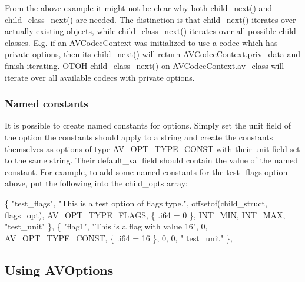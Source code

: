 From the above example it might not be clear why both child\+\_\+next() and child\+\_\+class\+\_\+next() are needed. The distinction is that child\+\_\+next() iterates over actually existing objects, while child\+\_\+class\+\_\+next() iterates over all possible child classes. E.\+g. if an \hyperlink{struct_a_v_codec_context}{A\+V\+Codec\+Context} was initialized to use a codec which has private options, then its child\+\_\+next() will return \hyperlink{struct_a_v_codec_context_af3379123060ad8cc9c321c29af4f8360}{A\+V\+Codec\+Context.\+priv\+\_\+data} and finish iterating. O\+T\+OH child\+\_\+class\+\_\+next() on \hyperlink{struct_a_v_codec_context_a90622d3af2a9abba986a1c9f7ca21b16}{A\+V\+Codec\+Context.\+av\+\_\+class} will iterate over all available codecs with private options.\hypertarget{group__avoptions_avoptions_implement_named_constants}{}\subsubsection{Named constants}\label{group__avoptions_avoptions_implement_named_constants}
It is possible to create named constants for options. Simply set the unit field of the option the constants should apply to a string and create the constants themselves as options of type A\+V\+\_\+\+O\+P\+T\+\_\+\+T\+Y\+P\+E\+\_\+\+C\+O\+N\+ST with their unit field set to the same string. Their default\+\_\+val field should contain the value of the named constant. For example, to add some named constants for the test\+\_\+flags option above, put the following into the child\+\_\+opts array\+: 
\begin{DoxyCode}
\{ \textcolor{stringliteral}{"test\_flags"}, \textcolor{stringliteral}{"This is a test option of flags type."},
  offsetof(child\_struct, flags\_opt), \hyperlink{group__avoptions_ggabd75aa30eb8ad6387672df9a1fa79444a7aaeee142b88a3078ddc57c644b49a7e}{AV\_OPT\_TYPE\_FLAGS}, \{ .i64 = 0 \}, 
      \hyperlink{macint_8h_a21658776274b3d146c674318b635a334}{INT\_MIN}, \hyperlink{macint_8h_a9ec306f36d50c7375e74f0d1c55a3a67}{INT\_MAX}, \textcolor{stringliteral}{"test\_unit"} \},
\{ \textcolor{stringliteral}{"flag1"}, \textcolor{stringliteral}{"This is a flag with value 16"}, 0, \hyperlink{group__avoptions_ggabd75aa30eb8ad6387672df9a1fa79444a0fa9f07d428bdc32495fe55c365c5329}{AV\_OPT\_TYPE\_CONST}, \{ .i64 = 16 \}, 0, 0, \textcolor{stringliteral}{"
      test\_unit"} \},
\end{DoxyCode}
\hypertarget{group__avoptions_avoptions_use}{}\subsection{Using A\+V\+Options}\label{group__avoptions_avoptions_use}
